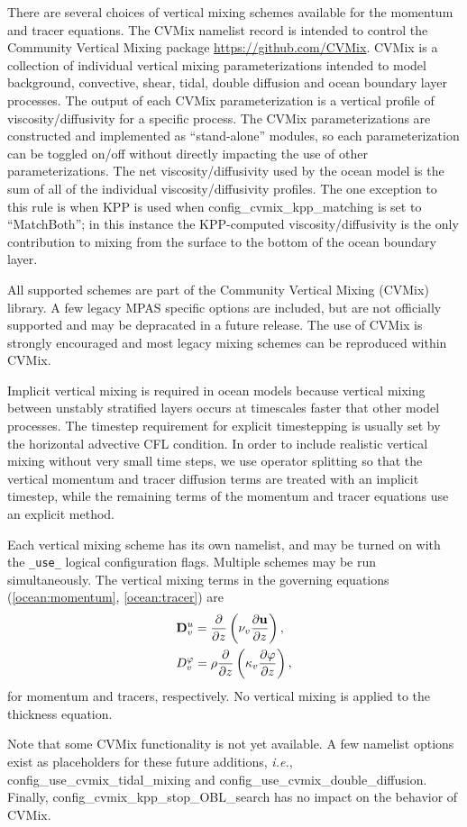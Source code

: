 There are several choices of vertical mixing schemes available for the momentum and tracer equations.  The CVMix namelist record is intended to control the Community Vertical Mixing package \url{https://github.com/CVMix}. CVMix is a collection of individual vertical mixing parameterizations intended to model background, convective, shear, tidal, double diffusion and ocean boundary layer processes. The output of each CVMix parameterization is a vertical profile of viscosity/diffusivity for a specific process. The CVMix parameterizations are constructed and implemented as ``stand-alone'' modules, so each parameterization can be toggled on/off without directly impacting the use of other parameterizations. The net viscosity/diffusivity used by the ocean model is the sum of all of the individual viscosity/diffusivity profiles. The one exception to this rule is when KPP is used when config\_cvmix\_kpp\_matching is set to ``MatchBoth''; in this instance the KPP-computed viscosity/diffusivity is the only contribution to mixing from the surface to the bottom of the ocean boundary layer.  

All supported schemes are part of the Community Vertical Mixing (CVMix) library.  A few legacy MPAS specific options are included, but are not officially supported and may be depracated in a future release.  The use of CVMix is strongly encouraged and most legacy mixing schemes can be reproduced within CVMix. 

Implicit vertical mixing is required in ocean models because vertical mixing between unstably stratified layers occurs at timescales faster that other model processes.  The timestep requirement for explicit timestepping is usually set by the horizontal advective CFL condition.  In order to include realistic vertical mixing without very small time steps, we use operator splitting so that the vertical momentum and tracer diffusion terms are treated with an implicit timestep, while the remaining terms of the momentum and tracer equations use an explicit method.

Each vertical mixing scheme has its own namelist, and may be turned
on with the \verb|_use_| logical configuration flags.  Multiple
schemes may be run simultaneously.  The vertical mixing terms in the
governing equations (\ref{ocean:momentum}, \ref{ocean:tracer}) are 
\begin{eqnarray} 
\label{ocean:\mode_v_mom_diff}
& \displaystyle {\bf D}^u_v=\frac{\partial }{\partial z} 
\left( \nu_v \frac{\partial {\bf u}}{\partial z} \right), \\
\label{\mode_v_tr_diff}
& \displaystyle D^\varphi_v = \rho \frac{\partial }{\partial z} 
\left( \kappa_v \frac{\partial \varphi}{\partial z} \right),
\end{eqnarray}
for momentum and tracers, respectively.  No vertical mixing is applied to the thickness equation.

Note that some CVMix functionality is not yet available.  A few namelist options exist as placeholders for these future additions, \textit{i.e.}, config\_use\_cvmix\_tidal\_mixing and config\_use\_cvmix\_double\_diffusion.  Finally, config\_cvmix\_kpp\_stop\_OBL\_search has no impact on the behavior of CVMix.

